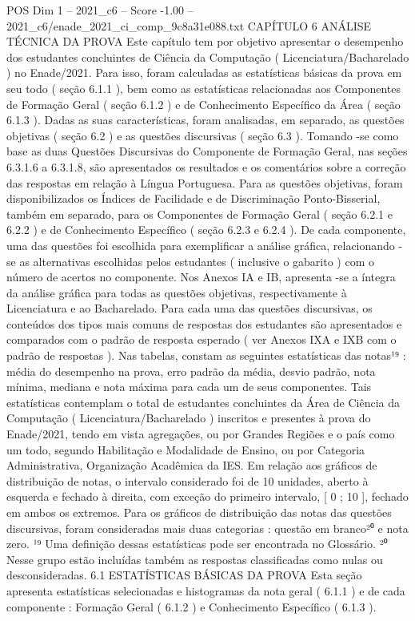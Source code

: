 \begin{textsample}{POS Dim 1 – 2021\_c6 – Score -1.00 – 2021\_c6/enade\_2021\_ci\_comp\_9c8a31e088.txt}  \label{ex:f1_pos_202}
CAPÍTULO 6 ANÁLISE TÉCNICA DA PROVA Este capítulo tem por objetivo apresentar o desempenho dos estudantes concluintes de Ciência da Computação ( Licenciatura/Bacharelado ) no Enade/2021.
Para isso, foram calculadas as estatísticas básicas da prova em seu todo ( seção 6.1.1 ), bem como as estatísticas relacionadas aos Componentes de Formação Geral ( seção 6.1.2 ) e de Conhecimento Específico da Área ( seção 6.1.3 ).
Dadas as suas características, foram analisadas, em separado, as questões objetivas ( seção 6.2 ) e as questões discursivas ( seção 6.3 ).
Tomando -se como base as duas Questões Discursivas do Componente de Formação Geral, nas seções 6.3.1.6 a 6.3.1.8, são apresentados os resultados e os comentários sobre a correção das respostas em relação à Língua Portuguesa.
Para as questões objetivas, foram disponibilizados os Índices de Facilidade e de Discriminação Ponto-Bisserial, também em separado, para os Componentes de Formação Geral ( seção 6.2.1 e 6.2.2 ) e de Conhecimento Específico ( seção 6.2.3 e 6.2.4 ).
De cada componente, uma das questões foi escolhida para exemplificar a análise gráfica, relacionando -se as alternativas escolhidas pelos estudantes ( inclusive o gabarito ) com o número de acertos no componente.
Nos Anexos IA e IB, apresenta -se a íntegra da análise gráfica para todas as questões objetivas, respectivamente à Licenciatura e ao Bacharelado.
Para cada uma das questões discursivas, os conteúdos dos tipos mais comuns de respostas dos estudantes são apresentados e comparados com o padrão de resposta esperado ( ver Anexos IXA e IXB com o padrão de respostas ).
Nas tabelas, constam as seguintes estatísticas das notas¹⁹ : média do desempenho na prova, erro padrão da média, desvio padrão, nota mínima, mediana e nota máxima para cada um de seus componentes.
Tais estatísticas contemplam o total de estudantes concluintes da Área de Ciência da Computação ( Licenciatura/Bacharelado ) inscritos e presentes à prova do Enade/2021, tendo em vista agregações, ou por Grandes Regiões e o país como um todo, segundo Habilitação e Modalidade de Ensino, ou por Categoria Administrativa, Organização Acadêmica da IES.
Em relação aos gráficos de distribuição de notas, o intervalo considerado foi de 10 unidades, aberto à esquerda e fechado à direita, com exceção do primeiro intervalo, [ 0 ; 10 ], fechado em ambos os extremos.
Para os gráficos de distribuição das notas das questões discursivas, foram consideradas mais duas categorias : questão em branco²⁰ e nota zero. ¹⁹ Uma definição dessas estatísticas pode ser encontrada no Glossário. ²⁰ Nesse grupo estão incluídas também as respostas classificadas como nulas ou desconsideradas. 6.1 ESTATÍSTICAS BÁSICAS DA PROVA Esta seção apresenta estatísticas selecionadas e histogramas da nota geral ( 6.1.1 ) e de cada componente : Formação Geral ( 6.1.2 ) e Conhecimento Específico ( 6.1.3 ).

\end{textsample}
